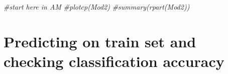 \documentclass[]{article}
\newenvironment{Shaded}{\begin{snugshade}}{\end{snugshade}}
\newcommand{\CommentTok}[1]{\textcolor[rgb]{0.56,0.35,0.01}{\textit{{#1}}}}
\begin{document}
\begin{Shaded}
\begin{Highlighting}[]
\CommentTok{#start here in AM}
\CommentTok{#plotcp(Mod2)}
\CommentTok{#summary(rpart(Mod2))}
\end{Highlighting}
\end{Shaded}

\section{Predicting on train set and checking classification
accuracy}\label{predicting-on-train-set-and-checking-classification-accuracy}

\begin{Shaded}
\end{Shaded}
\end{document}
